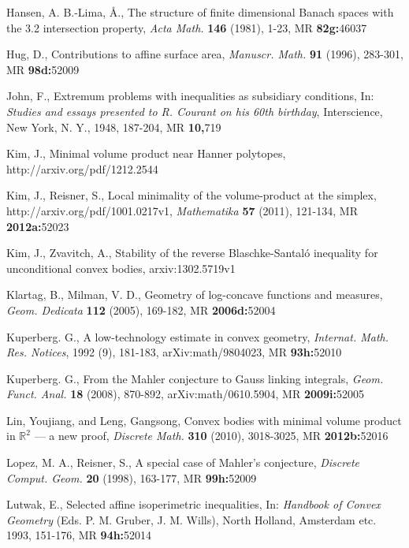 \documentclass[12pt]{article}
\begin{document}
\begin{thebibliography}{999999}
Hansen, A. B.-Lima, {\AA}., The structure of finite dimensional Banach spaces
with the 3.2 intersection property, {\it{Acta Math.}} {\bf{146}} (1981), 1-23,
MR {\bf{82g:}}{\rm{46037}}

Hug, D.,
Contributions to affine surface area,
{\it{Manuscr. Math.}} {\bf{91}} (1996), 283-301, MR {\bf{98d:}}{\rm{52009}}

John, F.,
Extremum problems with inequalities as subsidiary conditions,
In: {\it{Studies and essays presented to R. Courant on his 60th birthday}}, 
Interscience, New York, N. Y., 1948, 187-204, MR {\bf{10,}}{\rm{719}}

Kim, J., 
Minimal volume product near Hanner polytopes,
http://arxiv.org/pdf/1212.2544

Kim, J., Reisner, S.,
Local minimality of the volume-product at the simplex, 
http://arxiv.org/pdf/1001.0217v1, {\it{Mathematika}} {\bf{57}} (2011), 121-134,
MR {\bf{2012a:}}{\rm{52023}}

Kim, J., Zvavitch, A.,
Stability of the reverse Blaschke-Santal\'o inequality for unconditional
convex bodies,
arxiv:1302.5719v1

Klartag, B., Milman, V. D.,
Geometry of log-concave functions and measures,
{\it{Geom. Dedicata}} {\bf{112}} (2005), 169-182,
MR {\bf{2006d:}}{\rm{52004}}

Kuperberg. G.,
A low-technology estimate in convex geometry,
{\it{Internat. Math. Res. Notices}}, 1992 (9), 181-183, arXiv:math/9804023,
MR {\bf{93h:}}52010

Kuperberg. G.,
From the Mahler conjecture to Gauss linking integrals,
{\it{Geom. Funct. Anal.}} {\bf{18}} (2008), 870-892, arXiv:math/0610.5904,
MR {\bf{2009i:}}52005

Lin, Youjiang, and Leng, Gangsong,
Convex bodies with minimal volume product in ${\mathbb R}^2$ --- a new proof,
{\it{Discrete Math.}} {\bf{310}} (2010), 3018-3025, 
MR {\bf{2012b:}}52016

Lopez, M. A., Reisner, S.,
A special case of Mahler's conjecture,
{\it{Discrete Comput. Geom.}} {\bf{20}} (1998), 163-177, MR {\bf{99h:}}52009

Lutwak, E., 
Selected affine isoperimetric inequalities,
In: {\it{Handbook of Convex Geometry}} (Eds. P. M. Gruber, J. M. Wills), 
North Holland, Amsterdam etc. 1993, 151-176, MR {\bf{94h:}}{\rm{52014}}


\end{thebibliography}
\end{document}
